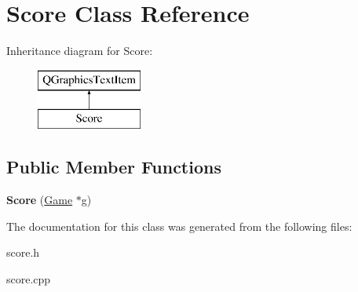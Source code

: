 \hypertarget{class_score}{}\section{Score Class Reference}
\label{class_score}
Inheritance diagram for Score\+:\begin{figure}[H]
\begin{center}
\leavevmode
\includegraphics[height=2.000000cm]{class_score}
\end{center}
\end{figure}
\subsection*{Public Member Functions}
\begin{DoxyCompactItemize}
\item 
\hypertarget{class_score_ad50f4da3306f8f920c23b33badae9d2d}{}{\bfseries Score} (\hyperlink{class_game}{Game} $\ast$g)\label{class_score_ad50f4da3306f8f920c23b33badae9d2d}

\end{DoxyCompactItemize}


The documentation for this class was generated from the following files\+:\begin{DoxyCompactItemize}
\item 
score.\+h\item 
score.\+cpp\end{DoxyCompactItemize}

